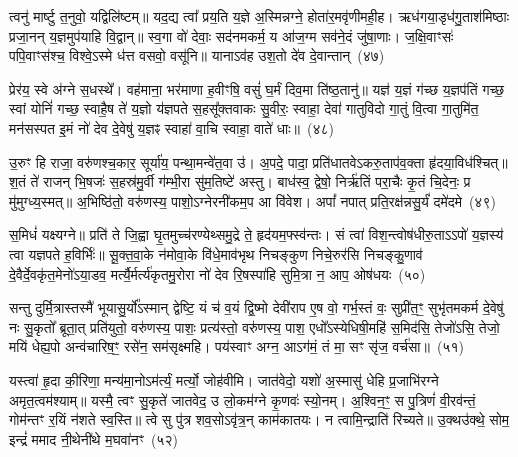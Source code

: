 त्वनु॑ मार्ष्टु त॒नुवो॒ यद्विलि॑ष्टम्॥ यद॒द्य त्वा᳚ प्रय॒ति य॒ज्ञे अ॒स्मिन्नग्ने॒ होता॑र॒मवृ॑णीमही॒ह। ऋध॑गया॒डृध॑गु॒ताश॑मिष्ठाः प्रजा॒नन् य॒ज्ञमुप॑याहि वि॒द्वान्॥ स्व॒गा वो॑ देवाः॒ सद॑नमकर्म॒ य आ॑ज॒ग्म सव॑ने॒दं जु॑षा॒णाः। ज॒क्षि॒वाꣳसः॑ पपि॒वाꣳस॑श्च॒ विश्वे॒\-ऽस्मे ध॑त्त वसवो॒ वसू॑नि॥ याना\-ऽव॑ह उश॒तो दे॑व दे॒वान्तान्~(४७)

प्रेर॑य॒ स्वे अ॑ग्ने स॒धस्थे᳚। वह॑माना॒ भर॑माणा ह॒वीꣳषि॒ वसुं॑ घ॒र्मं दिव॒मा ति॑ष्ठ॒तानु॑॥ यज्ञ॑ य॒ज्ञं ग॑च्छ य॒ज्ञप॑तिं गच्छ॒ स्वां योनिं॑ गच्छ॒ स्वाहै॒ष ते॑ य॒ज्ञो य॑ज्ञपते स॒हसू᳚क्तवाकः सु॒वीरः॒ स्वाहा॒ देवा॑ गातुविदो गा॒तुं वि॒त्वा गा॒तुमि॑त॒ मन॑सस्पत इ॒मं नो॑ देव दे॒वेषु॑ य॒ज्ञꣴ स्वाहा॑ वा॒चि स्वाहा॒ वाते॑ धाः॥~(४८)

{\anuvakamend[{कृ॒णो॒तु॒ तान॒ष्टाच॑त्वारिꣳशच्च}]}%

उ॒रुꣳ हि राजा॒ वरु॑णश्च॒कार॒ सूर्या॑य॒ पन्था॒मन्वे॑त॒वा उ॑। अ॒पदे॒ पादा॒ प्रति॑धातवे\-ऽकरु॒ताप॑व॒क्ता हृ॑दया॒विध॑श्चित्॥ श॒तं ते॑ राजन् भि॒षजः॑ स॒हस्र॑मु॒र्वी ग॑म्भी॒रा सु॑म॒तिष्टे॑ अस्तु। बाध॑स्व॒ द्वेषो॒ निर्\mbox{}ऋ॑तिं परा॒चैः कृ॒तं चि॒देनः॒ प्र मु॑मुग्ध्य॒स्मत्॥ अ॒भिष्ठि॑तो॒ वरु॑णस्य॒ पाशो॒\-ऽग्नेरनी॑कम॒प आ वि॑वेश। अपां᳚ नपात् प्रति॒रक्ष॑न्नसु॒र्यं॑ दमे॑दमे~(४९)

स॒मिधं॑ यक्ष्यग्ने॥ प्रति॑ ते जि॒ह्वा घृ॒तमुच्च॑रण्येथ्समु॒द्रे ते॒ हृद॑यम॒फ्स्व॑न्तः। सं त्वा॑ विश॒न्त्वोष॑धीरु॒ता\-ऽऽ\-पो॑ य॒ज्ञस्य॑ त्वा यज्ञपते ह॒विर्भिः॑॥ सू॒क्त॒वा॒के न॑मोवा॒के वि॑धे॒माव॑भृथ निचङ्कुण निचे॒रुर॑सि निचङ्कु॒णाव॑ दे॒वैर्दे॒वकृ॑त॒मेनो॑\-ऽया॒डव॒ मर्त्यै॒र्मर्त्य॑कृतमु॒रोरा नो॑ देव रि॒षस्पा॑हि सुमि॒त्रा न॒ आप॒ ओष॑धयः~(५०)

सन्तु दुर्मि॒त्रास्तस्मै॑ भूयासु॒र्यो᳚\-ऽस्मान् द्वेष्टि॒ यं च॑ व॒यं द्वि॒ष्मो देवी॑राप ए॒ष वो॒ गर्भ॒स्तं वः॒ सुप्री॑त॒ꣳ॒ सुभृ॑तमकर्म दे॒वेषु॑ नः सु॒कृतो᳚ ब्रूता॒त् प्रति॑युतो॒ वरु॑णस्य॒ पाशः॒ प्रत्य॑स्तो॒ वरु॑णस्य॒ पाश॒ एधो᳚\-ऽस्येधिषी॒महि॑ स॒मिद॑सि॒ तेजो॑\-ऽसि॒ तेजो॒ मयि॑ धेह्य॒पो अन्व॑चारिष॒ꣳ॒ रसे॑न॒ सम॑सृक्ष्महि। पय॑स्वाꣳ अग्न॒ आ\-ऽग॑मं॒ तं मा॒ सꣳ सृ॑ज॒ वर्च॑सा॥~(५१)

{\anuvakamend[{दमे॑दम॒ ओष॑धय॒ आ षट् च॑}]}%

यस्त्वा॑ हृ॒दा की॒रिणा॒ मन्य॑मा॒नो\-ऽम॑र्त्यं॒ मर्त्यो॒ जोह॑वीमि। जात॑वेदो॒ यशो॑ अ॒स्मासु॑ धेहि प्र॒जाभि॑रग्ने अमृत॒त्वम॑श्याम्॥ यस्मै॒ त्वꣳ सु॒कृते॑ जातवेद॒ उ लो॒कम॑ग्ने कृ॒णवः॑ स्यो॒नम्। अ॒श्विन॒ꣳ॒ स पु॒त्रिणं॑ वी॒रव॑न्तं॒ गोम॑न्तꣳ र॒यिं न॑शते स्व॒स्ति॥ त्वे सु पु॑त्र शव॒सो\-ऽवृ॑त्र॒न् काम॑कातयः। न त्वामि॒न्द्राति॑ रिच्यते॥ उ॒क्थउ॑क्थे॒ सोम॒ इन्द्रं॑ ममाद नी॒थेनी॑थे म॒घवा॑नꣳ~(५२)

